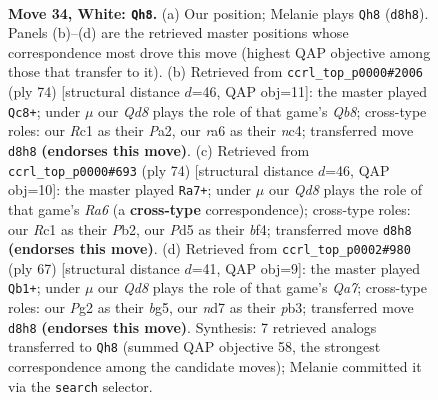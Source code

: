 \documentclass[11pt]{article}
\begin{document}
\clearpage

\begin{figure}[p]\centering
\begin{subfigure}{0.46\textwidth}\centering
\resizebox{\linewidth}{!}{%
\newchessgame
\chessboard[
  setfen={3Q4/3n1k2/r7/pb1Pp3/8/6p1/PPPK2P1/2R5 w - - 4 34},
  showmover=false,
  pgfstyle=straightmove, color=movearrow, markmove={d8-h8}
]}
\caption{}
\end{subfigure}\hfill
\begin{subfigure}{0.46\textwidth}\centering
\resizebox{\linewidth}{!}{%
\newchessgame
\chessboard[
  setfen={1Q6/p4rp1/1p2k3/3b4/2nP3P/2P5/P5P1/6K1 w - - 3 38},
  showmover=false,
  pgfstyle=straightmove, color=movearrow, markmove={b8-c8}
]}
\caption{}
\end{subfigure}
\\[4pt]
\begin{subfigure}{0.46\textwidth}\centering
\resizebox{\linewidth}{!}{%
\newchessgame
\chessboard[
  setfen={8/3k4/R1b2pp1/P1B5/5b1p/5p1P/1PP5/1K6 w - - 5 38},
  showmover=false,
  pgfstyle=straightmove, color=movearrow, markmove={a6-a7}
]}
\caption{}
\end{subfigure}\hfill
\begin{subfigure}{0.46\textwidth}\centering
\resizebox{\linewidth}{!}{%
\newchessgame
\chessboard[
  setfen={8/p4pk1/2R5/4p1B1/1p6/1P3B2/q5P1/6K1 b - - 1 34},
  showmover=false,
  pgfstyle=straightmove, color=movearrow, markmove={a2-b1}
]}
\caption{}
\end{subfigure}
\caption{\textbf{Move 34, White: \texttt{Qh8}.} (a) Our position; Melanie plays \texttt{Qh8} (\texttt{d8h8}). Panels (b)--(d) are the retrieved master positions whose correspondence most drove this move (highest QAP objective among those that transfer to it). (b) Retrieved from \texttt{ccrl\_top\_p0000\#2006} (ply 74) [structural distance $d$=46, QAP obj=11]: the master played \texttt{Qc8+}; under $\mu$ our \emph{Qd8} plays the role of that game's \emph{Qb8}; cross-type roles: our \emph{R}c1 as their \emph{P}a2, our \emph{r}a6 as their \emph{n}c4; transferred move \texttt{d8h8} \textbf{(endorses this move)}. (c) Retrieved from \texttt{ccrl\_top\_p0000\#693} (ply 74) [structural distance $d$=46, QAP obj=10]: the master played \texttt{Ra7+}; under $\mu$ our \emph{Qd8} plays the role of that game's \emph{Ra6} (a \textbf{cross-type} correspondence); cross-type roles: our \emph{R}c1 as their \emph{P}b2, our \emph{P}d5 as their \emph{b}f4; transferred move \texttt{d8h8} \textbf{(endorses this move)}. (d) Retrieved from \texttt{ccrl\_top\_p0002\#980} (ply 67) [structural distance $d$=41, QAP obj=9]: the master played \texttt{Qb1+}; under $\mu$ our \emph{Qd8} plays the role of that game's \emph{Qa7}; cross-type roles: our \emph{P}g2 as their \emph{b}g5, our \emph{n}d7 as their \emph{p}b3; transferred move \texttt{d8h8} \textbf{(endorses this move)}. Synthesis: 7 retrieved analogs transferred to \texttt{Qh8} (summed QAP objective 58, the strongest correspondence among the candidate moves); Melanie committed it via the \texttt{search} selector.}
\label{fig:thought-m66}
\end{figure}
\end{document}
